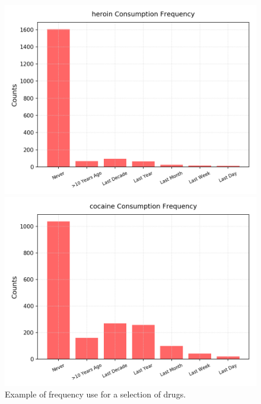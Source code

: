 \documentclass{article}
\begin{document}
\begin{figure}[h!]
\begin{minipage}[b]{0.32\textwidth}
\end{minipage}
\begin{minipage}[b]{0.32\textwidth}
	\includegraphics[width=\textwidth]{plots/drugsPlots/heroin_freq.png}

\end{minipage}
\begin{minipage}[b]{0.32\textwidth}
	\includegraphics[width=\textwidth]{plots/drugsPlots/cocaine_freq.png}
\end{minipage}

	\caption{Example of frequency use for a selection of drugs.}
\label{drugs1}
\end{figure}
\end{document}
